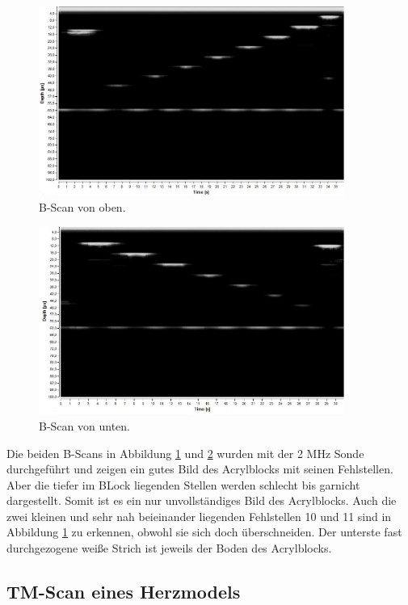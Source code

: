 \begin{figure}
  \centering
  \includegraphics[width = 10cm]{data/BScanOben.jpg}
  \caption{B-Scan von oben.}
  \label{fig:abbA3}
\end{figure}
\FloatBarrier

\begin{figure}
  \centering
  \includegraphics[width = 10cm]{data/BScanUnten.jpg}
  \caption{B-Scan von unten.}
  \label{fig:abbA4}
\end{figure}
\FloatBarrier

Die beiden B-Scans in Abbildung \ref{fig:abbA3} und \ref{fig:abbA4} wurden mit der 2 MHz Sonde durchgeführt und zeigen ein gutes Bild des Acrylblocks mit seinen Fehlstellen.
Aber die tiefer im BLock liegenden Stellen werden schlecht bis garnicht dargestellt. 
Somit ist es ein nur unvollständiges Bild des Acrylblocks.
Auch die zwei kleinen und sehr nah beieinander liegenden Fehlstellen 10 und 11 sind in Abbildung \ref{fig:abbA3} zu erkennen, obwohl sie sich doch überschneiden.
Der unterste fast durchgezogene weiße Strich ist jeweils der Boden des Acrylblocks.

\subsection{TM-Scan eines Herzmodels}
\label{sec:herz}

